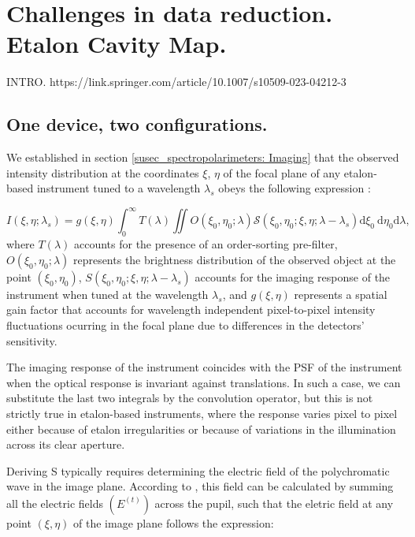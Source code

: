 \chapter{\label{CH:challenges}Challenges in data reduction. Etalon Cavity Map.}

INTRO.
https://link.springer.com/article/10.1007/s10509-023-04212-3

\section{One device, two configurations.}

We established in section \ref{susec_spectropolarimeters: Imaging} that the observed intensity distribution at the coordinates $\xi$, $\eta$ of the focal plane of any etalon-based instrument tuned to a wavelength $\lambda_s$ obeys the following expression \citep{franI}: 

\begin{equation}
    I\left(\xi, \eta ; \lambda_{s}\right)=g(\xi, \eta)\int_{0}^{\infty} T(\lambda) \iint  O\left(\xi_0, \eta_0 ; \lambda\right)  \mathcal{S}\left(\xi_0, \eta_0; \xi , \eta; \lambda-\lambda_{s}\right)  \mathrm{d} \xi_{0} \mathrm{~d} \eta_{0}\mathrm{d} \lambda ,
    \label{eq_etalon_theory: General_Intensity}
\end{equation}
where $T(\lambda)$ accounts for the presence of an order-sorting pre-filter, $O\left(\xi_0, \eta_0 ; \lambda\right)$ represents the brightness distribution of the observed object at the point $\left(\xi_0, \eta_0\right)$, $S\left(\xi_0, \eta_0; \xi , \eta; \lambda-\lambda_{s}\right)$ accounts for the imaging response of the instrument when tuned at the wavelength $\lambda_{s}$, and $g(\xi, \eta)$ represents a spatial gain factor that accounts for wavelength independent pixel-to-pixel intensity fluctuations ocurring in the focal plane due to differences in the detectors' sensitivity. 

The imaging response of the instrument coincides with the PSF of the instrument when the optical response is invariant against translations. In such a case, we can substitute the last two integrals by the convolution operator, but this is not strictly true in etalon-based instruments, where the response varies pixel to pixel either because of etalon irregularities or because of variations in the illumination across its clear aperture.

Deriving S typically requires determining the electric field of the polychromatic wave in the image plane. According to \cite{franI}, this field can be calculated by summing all the electric fields $(E^{(t)})$ across the pupil, such that the eletric field at any point $(\xi, \eta)$ of the image plane follows the expression:

